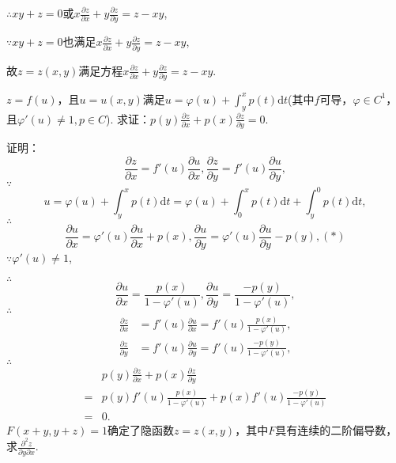 \documentclass[12pt,UTF8]{ctexart}
\begin{document}
\begin{enumerate}
$\therefore xy+z=0$或$x\frac{\partial z}{\partial x}+y\frac{\partial z}{\partial y}=z-xy$,\footnotemark{}

$\because xy+z=0$也满足$x\frac{\partial z}{\partial x}+y\frac{\partial z}{\partial y}=z-xy$,

故$z=z(x,y)$满足方程$x\frac{\partial z}{\partial x}+y\frac{\partial z}{\partial y}=z-xy$.

$z=f(u)$，且$u=u(x,y)$满足$u=\varphi(u)+\int_y^xp(t)\mathrm dt$(其中$f$可导，$\varphi\in C^1$，且$\varphi'(u)\neq1,p\in C$). 求证：$p(y)\frac{\partial z}{\partial x}+p(x)\frac{\partial z}{\partial y}=0$.

证明：\[
\frac{\partial z}{\partial x}=f'(u)\frac{\partial u}{\partial x},\frac{\partial z}{\partial y}=f'(u)\frac{\partial u}{\partial y},
\]
$\because$
\[
u=\varphi(u)+\int_y^xp(t)\mathrm dt=\varphi(u)+\int_0^xp(t)\mathrm dt+\int_y^0p(t)\mathrm dt,
\]
$\therefore$
\[\frac{\partial u}{\partial x}=\varphi'(u)\frac{\partial u}{\partial x}+p(x),\frac{\partial u}{\partial y}=\varphi'(u)\frac{\partial u}{\partial y}-p(y),(*)\]
$\because\varphi'(u)\neq1$,

$\therefore$
\[
\frac{\partial u}{\partial x}=\frac{p(x)}{1-\varphi'(u)},\frac{\partial u}{\partial y}=\frac{-p(y)}{1-\varphi'(u)},
\]
$\therefore$
\[\begin{split}
\frac{\partial z}{\partial x}&=f'(u)\frac{\partial u}{\partial x}=f'(u)\frac{p(x)}{1-\varphi'(u)},\\
\frac{\partial z}{\partial y}&=f'(u)\frac{\partial u}{\partial y}=f'(u)\frac{-p(y)}{1-\varphi'(u)},
\end{split}\]
$\therefore$
\[\begin{split}
&p(y)\frac{\partial z}{\partial x}+p(x)\frac{\partial z}{\partial y}\\
=&p(y)f'(u)\frac{p(x)}{1-\varphi'(u)}+p(x)f'(u)\frac{-p(y)}{1-\varphi'(u)}\\
=&0.
\end{split}\]
$F(x+y,y+z)=1$确定了隐函数$z=z(x,y)$，其中$F$具有连续的二阶偏导数，求$\frac{\partial^2z}{\partial y\partial x}$.


\end{enumerate}
\end{document}
